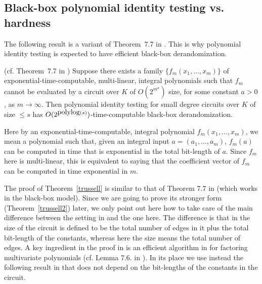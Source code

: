 \documentclass[11pt]{article}
\begin{document}
\subsection{Black-box polynomial identity testing vs. hardness}
The following result is a variant of Theorem~7.7  in \cite{russell}. This is why 
polynomial identity testing is expected to have efficient black-box derandomization. 

\begin{theorem} \label{trussell} (cf.  Theorem~7.7  in  \cite{russell})
Suppose there exists a family $\{f_m(x_1,\ldots,x_m)\}$ of
exponential-time-computable,  multi-linear,  integral
polynomials   such that 
$f_m$  cannot be evaluated by a circuit  over $K$ of  
$O(2^{m^a})$ size, for some constant
$a>0$, as $m \rightarrow \infty$.  
Then polynomial identity testing for small degree 
circuits over $K$  of size $\le s$ has $O(2^{{\mbox {polylog}}(s)})$-time-computable black-box derandomization. 
\end{theorem}

Here by an exponential-time-computable, integral polynomial $f_m(x_1,\ldots,x_m)$, 
we mean a polynomial such that, given an integral input $a=(a_1,\ldots,a_m)$, 
$f_m(a)$  can be computed in time that is exponential in the total 
bit-length of $a$. Since $f_m$ here is multi-linear, this is equivalent to saying that
the coefficient vector of $f_m$ can be computed in time exponential in $m$.

The proof of Theorem~\ref{trussell} is  similar to that of
Theorem 7.7 in \cite{russell} (which works in the black-box model).
Since we are going to prove its stronger form (Theorem~\ref{trussell2}) later, we only point out here how to take care of the 
main difference between the setting in \cite{russell} and the one here. 
The difference  is that in \cite{russell} the size of the circuit is defined to be the total number of  edges in it plus the total
bit-length of the constants, whereas here the size  means the total number of edges. 
A key ingredient in  the  proof in \cite{russell} is 
an efficient algorithm in \cite{kaltofen} for factoring multivariate polynomials 
(cf. Lemma 7.6. in \cite{russell}). In its place we use instead the following result  
in \cite{kaltofen,kaltofen2} that 
does not depend on the bit-lengths of the  constants  in the circuit.
\end{document}
